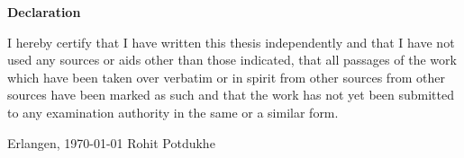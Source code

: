 \documentclass[12pt,oneside,reqno,a4paper,twoside]{report}
\begin{document}
\clearpage
\printunsrtglossary[type=abbreviations]


\clearpage
{}
%


%





\clearpage\thispagestyle{empty}



\begin{center}\textbf{\large Declaration}\end{center}

\noindent
 I hereby certify that I have written this thesis independently
and that I have not used any sources or aids other than those indicated,
that all passages of the work which have been taken over verbatim or in spirit from other sources
from other sources have been marked as such and that the work 
has not yet been submitted to any examination authority in the same or a similar form.


\vspace{4\baselineskip}

\noindent
Erlangen, \today \hspace*{2cm} Rohit Potdukhe


\clearpage

\end{document}
